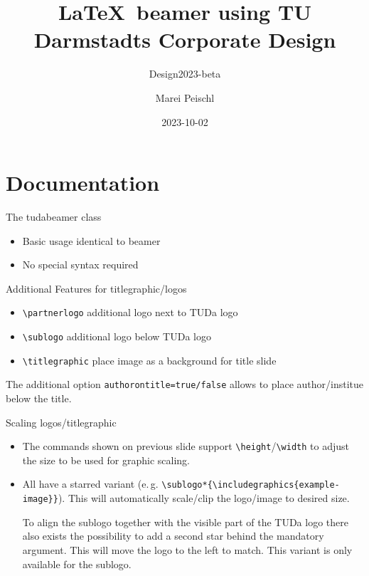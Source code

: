 \documentclass[
	english,%
	accentcolor=9c,%
]{tudabeamer}
\title[TUDaBeamer2023]{\LaTeX~beamer using TU Darmstadts Corporate Design}
\subtitle{Design2023-beta}
\author[M. Peischl]{Marei Peischl}
\institute{pei\TeX}
\date{2023-10-02}%
\newcommand*{\code}[1]{\texttt{#1}}
\begin{document}
\maketitle

\tableofcontents

\section{Documentation}

\begin{frame}{The tudabeamer class}
	\begin{itemize}
		\item Basic usage identical to beamer
		\item No special syntax required
	\end{itemize}
\end{frame}

\begin{frame}{Additional Features for titlegraphic/logos}
	\begin{itemize}
		\item \code{\textbackslash{}partnerlogo} additional logo next to TUDa logo
		\item \code{\textbackslash{}sublogo} additional logo below TUDa logo
		\item \code{\textbackslash{}titlegraphic} place image as a background for title slide
	\end{itemize}
	The additional option \code{authorontitle=true/false} allows to place author/institue below the title.
\end{frame}

\begin{frame}{Scaling logos/titlegraphic}
	\begin{itemize}
		\item The commands shown on previous slide support \code{\textbackslash{}height}/\code{\textbackslash{}width} to adjust the size to be used for graphic scaling.
		\item All have a starred variant (e.\,g. \code{\textbackslash{}sublogo*\{\textbackslash{}includegraphics\{example-image\}\}}). This will automatically scale/clip the logo/image to desired size.

		      To align the sublogo together with the visible part of the TUDa logo there also exists the possibility to add a second star behind the mandatory argument. This will move the logo to the left to match. This variant is only available for the sublogo.
	\end{itemize}
\end{frame}
\end{document}
